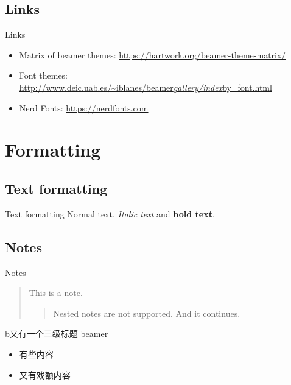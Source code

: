 \documentclass[
  11pt,
  aspectratio=169]{beamer}
\providecommand{\tightlist}{%
  \setlength{\itemsep}{0pt}\setlength{\parskip}{0pt}}
\begin{document}
\subsection{Links}\label{links}

\begin{frame}{Links}
\begin{itemize}
\tightlist
\item
  Matrix of beamer themes:
  \url{https://hartwork.org/beamer-theme-matrix/}
\item
  Font themes:
  \href{http://www.deic.uab.es/~iblanes/beamer_gallery/index_by_font.html}{http://www.deic.uab.es/\textasciitilde iblanes/beamer\emph{gallery/index}by\_font.html}
\item
  Nerd Fonts: \url{https://nerdfonts.com}
\end{itemize}
\end{frame}

\section{Formatting}\label{formatting}

\subsection{Text formatting}\label{text-formatting}

\begin{frame}{Text formatting}
Normal text. \emph{Italic text} and \textbf{bold text}.
\end{frame}

\subsection{Notes}\label{notes}

\begin{frame}{Notes}
\begin{quote}
This is a note.

\begin{quote}
Nested notes are not supported. And it continues.
\end{quote}
\end{quote}
\end{frame}

\begin{frame}{b又有一个三级标题 beamer}
\label{bux53c8ux6709ux4e00ux4e2aux4e09ux7ea7ux6807ux9898-beamer}
\begin{itemize}
\tightlist
\item
  有些内容
\item
  又有戏额内容
\end{itemize}
\end{frame}
\end{document}
